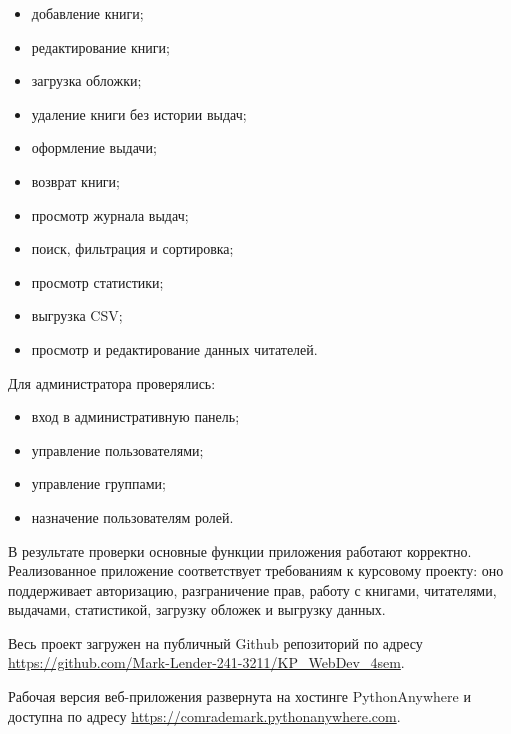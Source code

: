 \begin{itemize}
    \item добавление книги;
    \item редактирование книги;
    \item загрузка обложки;
    \item удаление книги без истории выдач;
    \item оформление выдачи;
    \item возврат книги;
    \item просмотр журнала выдач;
    \item поиск, фильтрация и сортировка;
    \item просмотр статистики;
    \item выгрузка CSV;
    \item просмотр и редактирование данных читателей.
\end{itemize}

Для администратора проверялись:

\begin{itemize}
    \item вход в административную панель;
    \item управление пользователями;
    \item управление группами;
    \item назначение пользователям ролей.
\end{itemize}

В результате проверки основные функции приложения работают корректно. Реализованное приложение соответствует требованиям к курсовому проекту: оно поддерживает авторизацию, разграничение прав, работу с книгами, читателями, выдачами, статистикой, загрузку обложек и выгрузку данных.

Весь проект загружен на публичный Github репозиторий по адресу \url{https://github.com/Mark-Lender-241-3211/KP_WebDev_4sem}.

Рабочая версия веб-приложения развернута на хостинге PythonAnywhere и доступна по адресу \url{https://comrademark.pythonanywhere.com}.
